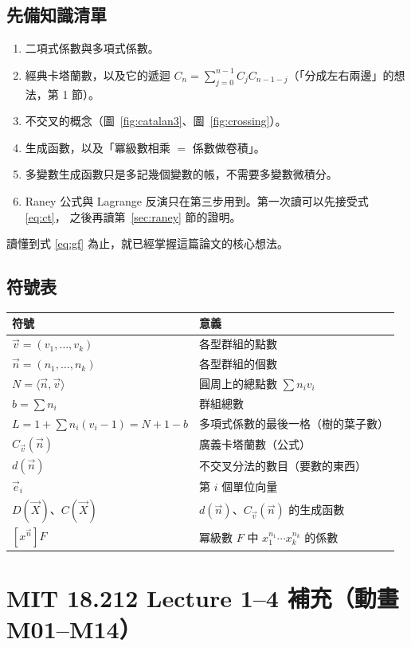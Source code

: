 \documentclass[11pt,a4paper]{article}
\newcommand{\vn}{\vec n}
\newcommand{\vv}{\vec v}
\newcommand{\ve}{\vec e}
\newcommand{\vX}{\vec X}
\newcommand{\ip}[2]{\langle #1,#2\rangle}
\newcommand{\Cv}{C_{\vv}}
\begin{document}
\subsection*{先備知識清單}
\begin{enumerate}
  \item 二項式係數與多項式係數。
  \item 經典卡塔蘭數，以及它的遞迴 $C_n=\sum_{j=0}^{n-1}C_jC_{n-1-j}$（「分成左右兩邊」的想法，第 1 節）。
  \item 不交叉的概念（圖~\ref{fig:catalan3}、圖~\ref{fig:crossing}）。
  \item 生成函數，以及「冪級數相乘 $=$ 係數做卷積」。
  \item 多變數生成函數只是多記幾個變數的帳，不需要多變數微積分。
  \item Raney 公式與 Lagrange 反演只在第三步用到。第一次讀可以先接受式 \eqref{eq:ct}，
        之後再讀第~\ref{sec:raney} 節的證明。
\end{enumerate}
讀懂到式 \eqref{eq:gf} 為止，就已經掌握這篇論文的核心想法。

\subsection*{符號表}
\begin{tabular}{@{}ll@{}}
\toprule
符號 & 意義\\
\midrule
$\vv=(v_1,\ldots,v_k)$ & 各型群組的點數\\
$\vn=(n_1,\ldots,n_k)$ & 各型群組的個數\\
$N=\ip{\vn}{\vv}$ & 圓周上的總點數 $\sum n_iv_i$\\
$b=\sum n_i$ & 群組總數\\
$L=1+\sum n_i(v_i-1)=N+1-b$ & 多項式係數的最後一格（樹的葉子數）\\
$\Cv(\vn)$ & 廣義卡塔蘭數（公式）\\
$d(\vn)$ & 不交叉分法的數目（要數的東西）\\
$\ve_i$ & 第 $i$ 個單位向量\\
$D(\vX)$、$C(\vX)$ & $d(\vn)$、$\Cv(\vn)$ 的生成函數\\
$[x^{\vn}]F$ & 冪級數 $F$ 中 $x_1^{n_1}\cdots x_k^{n_k}$ 的係數\\
\bottomrule
\end{tabular}

\appendix
\section{MIT 18.212 Lecture 1--4 補充（動畫 M01--M14）}\label{sec:mit}
\end{document}
